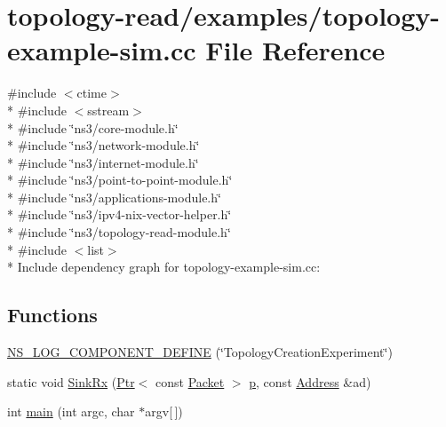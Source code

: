 \hypertarget{topology-example-sim_8cc}{}\section{topology-\/read/examples/topology-\/example-\/sim.cc File Reference}
\label{topology-example-sim_8cc}
{\ttfamily \#include $<$ctime$>$}\\*
{\ttfamily \#include $<$sstream$>$}\\*
{\ttfamily \#include \char`\"{}ns3/core-\/module.\+h\char`\"{}}\\*
{\ttfamily \#include \char`\"{}ns3/network-\/module.\+h\char`\"{}}\\*
{\ttfamily \#include \char`\"{}ns3/internet-\/module.\+h\char`\"{}}\\*
{\ttfamily \#include \char`\"{}ns3/point-\/to-\/point-\/module.\+h\char`\"{}}\\*
{\ttfamily \#include \char`\"{}ns3/applications-\/module.\+h\char`\"{}}\\*
{\ttfamily \#include \char`\"{}ns3/ipv4-\/nix-\/vector-\/helper.\+h\char`\"{}}\\*
{\ttfamily \#include \char`\"{}ns3/topology-\/read-\/module.\+h\char`\"{}}\\*
{\ttfamily \#include $<$list$>$}\\*
Include dependency graph for topology-\/example-\/sim.cc\+:
\subsection*{Functions}
\begin{DoxyCompactItemize}
\item 
\hyperlink{topology-example-sim_8cc_a4871085c27c50efc2f9308fecf26c88f}{N\+S\+\_\+\+L\+O\+G\+\_\+\+C\+O\+M\+P\+O\+N\+E\+N\+T\+\_\+\+D\+E\+F\+I\+NE} (\char`\"{}Topology\+Creation\+Experiment\char`\"{})
\item 
static void \hyperlink{topology-example-sim_8cc_ab5a3a26cb523a53ed19ba80dcbb97d11}{Sink\+Rx} (\hyperlink{classns3_1_1Ptr}{Ptr}$<$ const \hyperlink{classns3_1_1Packet}{Packet} $>$ \hyperlink{lte__link__budget__x2__handover__measures_8m_ac9de518908a968428863f829398a4e62}{p}, const \hyperlink{classns3_1_1Address}{Address} \&ad)
\item 
int \hyperlink{topology-example-sim_8cc_a0ddf1224851353fc92bfbff6f499fa97}{main} (int argc, char $\ast$argv\mbox{[}$\,$\mbox{]})
\end{DoxyCompactItemize}
